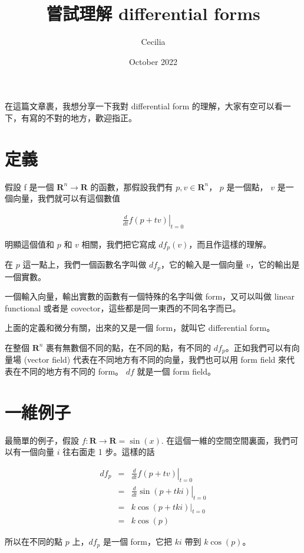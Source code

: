 \documentclass{article}
\title{嘗試理解 differential forms}
\author{Cecilia}
\date{October 2022}
\begin{document}
\maketitle
在這篇文章裹，我想分享一下我對 differential form 的理解，大家有空可以看一下，有寫的不對的地方，歡迎指正。

\section{定義}
假設 f 是一個 $ \mathbf{R}^n \to \mathbf{R} $ 的函數，那假設我們有 $ p, v \in \mathbf{R}^n $， $ p $ 是一個點， $ v $ 是一個向量，我們就可以有這個數值

\begin{eqnarray*}
  \left. \frac{d}{dt} f(p + tv)\right|_{t = 0}
\end{eqnarray*}

明顯這個值和 $ p $ 和 $ v $ 相關，我們把它寫成 $ df_p(v) $，而且作這樣的理解。

在 $ p $ 這一點上，我們一個函數名字叫做 $ df_p $，它的輸入是一個向量 $ v $，它的輸出是一個實數。

一個輸入向量，輸出實數的函數有一個特殊的名字叫做 form，又可以叫做 linear functional 或者是 covector，這些都是同一東西的不同名字而已。

上面的定義和微分有關，出來的又是一個 form，就叫它 differential form。

在整個 $ \mathbf{R}^n $ 裹有無數個不同的點，在不同的點，有不同的 $ df_p $。正如我們可以有向量場 (vector field) 代表在不同地方有不同的向量，我們也可以用 form field 來代表在不同的地方有不同的 form。 $ df $ 就是一個 form field。

\section{一維例子}
最簡單的例子，假設 $ f: \mathbf{R} \to \mathbf{R} = \sin(x) $. 在這個一維的空間空間裏面，我們可以有一個向量 $ i $ 往右面走 1 步。這樣的話

\begin{eqnarray*}
  df_p &=& \left. \frac{d}{dt} f(p + tv)\right|_{t = 0} \\
       &=& \left. \frac{d}{dt} \sin(p + tki)\right|_{t = 0} \\
       &=& \left. k\cos(p + tki)\right|_{t = 0} \\
       &=& k \cos(p)
\end{eqnarray*}

所以在不同的點 $ p $ 上，$ df_p $ 是一個 form，它把 $ ki $ 帶到 $ k \cos(p) $。
\end{document}
